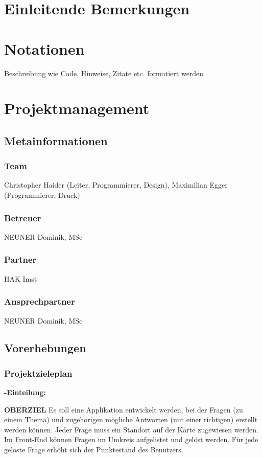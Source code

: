 \def \currentAuthor {Gabi Sorglos} %

\chapter*{Einleitende Bemerkungen}

\chapter*{Notationen}
Beschreibung wie Code, Hinweise, Zitate etc. formatiert werden  

\chapter{Projektmanagement}

\section{Metainformationen}
\subsection{Team}
Christopher Haider (Leiter, Programmierer, Design), Maximilian Egger (Programmierer, Druck)
\subsection{Betreuer}
NEUNER Dominik, MSc
\subsection{Partner}
HAK Imst
\subsection{Ansprechpartner}
NEUNER Dominik, MSc
\section{Vorerhebungen}
\subsection{Projektzieleplan}

\textbf {-Einteilung:}


\textbf {OBERZIEL} Es soll eine Applikation entwickelt werden, bei der Fragen (zu einem Thema) und zugehörigen mögliche Antworten (mit einer richtigen) erstellt werden können. Jeder Frage muss ein Standort auf der Karte zugewiesen werden.
Im Front-End können Fragen im Umkreis aufgelistet und gelöst werden. Für jede gelöste Frage erhöht sich der Punktestand des Benutzers.  


